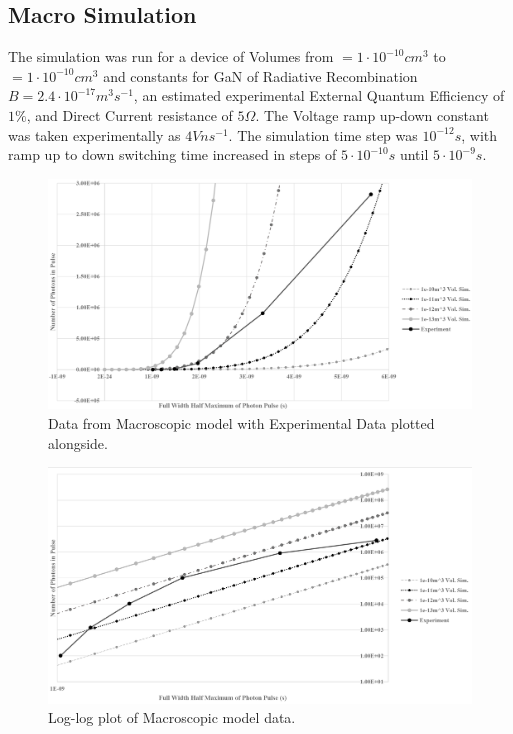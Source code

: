 \documentclass[titlepage]{article}
\begin{document}
\subsection{Macro Simulation}
The simulation was run for a device of Volumes from $= 1\cdot 10^{-10} cm^3 $ to $= 1\cdot 10^{-10} cm^3 $ and constants for GaN of Radiative Recombination $B = 2.4\cdot10^{-17} m^3 s^{-1}$,\cite{NSD} an estimated experimental External Quantum Efficiency of $1\%$, and Direct Current resistance of $5\Omega$. The Voltage ramp up-down constant was taken experimentally as $4 V ns^{-1}$. The simulation time step was $10^{-12} s$, with ramp up to down switching time increased in steps of $5 \cdot 10^{-10} s$ until $5 \cdot 10^{-9} s$. \\
\begin{figure}[H]
	\centering
	\includegraphics[scale=0.8]{Figures/MacroGraph}
	\caption{Data from Macroscopic model with Experimental Data plotted alongside.\label{res:Mac:G1}}
\end{figure}
\begin{figure}[H]
	\centering
	\includegraphics[scale=0.8]{Figures/MacroGraph_log}
	\caption{Log-log plot of Macroscopic model data.\label{res:Mac:G1_log}}
\end{figure}
\end{document}
